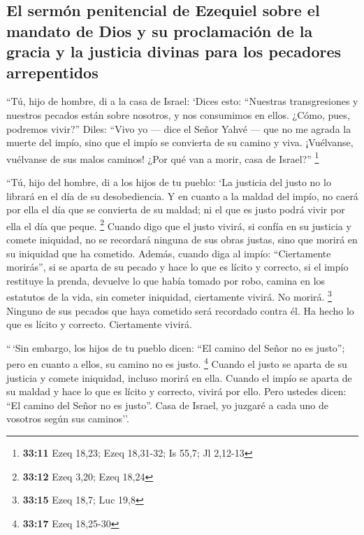 \hypertarget{el-sermuxf3n-penitencial-de-ezequiel-sobre-el-mandato-de-dios-y-su-proclamaciuxf3n-de-la-gracia-y-la-justicia-divinas-para-los-pecadores-arrepentidos}{%
\subsection{El sermón penitencial de Ezequiel sobre el mandato de Dios y
su proclamación de la gracia y la justicia divinas para los pecadores
arrepentidos}\label{el-sermuxf3n-penitencial-de-ezequiel-sobre-el-mandato-de-dios-y-su-proclamaciuxf3n-de-la-gracia-y-la-justicia-divinas-para-los-pecadores-arrepentidos}}

 ``Tú, hijo de hombre, di a la casa de Israel: `Dices
esto: ``Nuestras transgresiones y nuestros pecados están sobre nosotros,
y nos consumimos en ellos. ¿Cómo, pues, podremos vivir?''
 Diles: ``Vivo yo --- dice el Señor Yahvé --- que no me
agrada la muerte del impío, sino que el impío se convierta de su camino
y viva. ¡Vuélvanse, vuélvanse de sus malos caminos! ¿Por qué van a
morir, casa de Israel?'' \footnote{\textbf{33:11} Ezeq 18,23; Ezeq
  18,31-32; Is 55,7; Jl 2,12-13}

 ``Tú, hijo del hombre, di a los hijos de tu pueblo: `La
justicia del justo no lo librará en el día de su desobediencia. Y en
cuanto a la maldad del impío, no caerá por ella el día que se convierta
de su maldad; ni el que es justo podrá vivir por ella el día que peque.
\footnote{\textbf{33:12} Ezeq 3,20; Ezeq 18,24}  Cuando
digo que el justo vivirá, si confía en su justicia y comete iniquidad,
no se recordará ninguna de sus obras justas, sino que morirá en su
iniquidad que ha cometido.  Además, cuando diga al impío:
``Ciertamente morirás'', si se aparta de su pecado y hace lo que es
lícito y correcto,  si el impío restituye la prenda,
devuelve lo que había tomado por robo, camina en los estatutos de la
vida, sin cometer iniquidad, ciertamente vivirá. No morirá. \footnote{\textbf{33:15}
  Ezeq 18,7; Luc 19,8}  Ninguno de sus pecados que haya
cometido será recordado contra él. Ha hecho lo que es lícito y correcto.
Ciertamente vivirá.

 ``\,`Sin embargo, los hijos de tu pueblo dicen: ``El
camino del Señor no es justo''; pero en cuanto a ellos, su camino no es
justo. \footnote{\textbf{33:17} Ezeq 18,25-30}  Cuando el
justo se aparta de su justicia y comete iniquidad, incluso morirá en
ella.  Cuando el impío se aparta de su maldad y hace lo
que es lícito y correcto, vivirá por ello.  Pero ustedes
dicen: ``El camino del Señor no es justo''. Casa de Israel, yo juzgaré a
cada uno de vosotros según sus caminos''.


